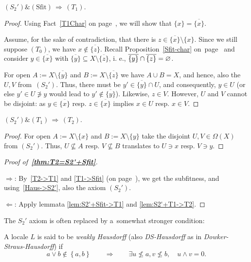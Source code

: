\begin{lem} \label{lem:S2'+Sfit->T1}
  $(S_2') \& (\text{Sfit}) \, \Rightarrow \, (T_1)$.
\end{lem}
\begin{proof}
  Using Fact~\ref{T1Char} on page~\pageref{T1Char}, we will show that $\{ x \}
  = \overline{\{ x \}}$.

  Assume, for the sake of contradiction, that there is $z\in \overline{\{ x \}}
  \setminus \{ x \}$.
  Since we still suppose $(T_0)$, we have $x\not\in \overline{\{ z \}}$.
  Recall Proposition~\ref{Sfit-char} on~page~\pageref{Sfit-char} and consider
  $y\in \overline{\{x\}}$ with $\overline{\{y\}} \subseteq X\setminus
  \overline{\{ z \}}$, i. e., $\overline{\{ y \}} \cap \overline{\{ z \}} =
  \varnothing$.

  For open $A := X \setminus \overline{\{ y \}}$ and $B := X \setminus
  \overline{\{ z \}}$ we have $A \cup B = X$, and hence, also the $U, V$
  from~$(S_2')$.
  Thus, there must be $y'\in \overline{\{ y \}} \cap U$, and consequently,
  $y\in U$ (or else $y'\in U\not\owns y$ would lead to $y'\not\in \overline{\{
  y \}}$).
  Likewise, $z\in V$.
  However, $U$ and $V$ cannot be disjoint:
  as $y\in \overline{\{ x \}}$ resp. $z\in \overline{\{ x \}}$ implies $x\in U$
  resp. $x\in V$.
\end{proof}

\begin{lem} \label{lem:S2'+T1->T2}
  $(S_2') \& (T_1) \, \Rightarrow \, (T_2)$.
\end{lem}
\begin{proof}
  For open $A := X\setminus \{ x \}$ and $B := X\setminus \{ y \}$ take the
  disjoint $U, V\in \Omega(X)$ from $(S_2')$.
  Thus, $U\not\subseteq A$ resp. $V\not\subseteq B$ translates to $U\owns x$
  resp. $V\owns y$.
\end{proof}

\begin{proof}[Proof of~{\bf\ref{thm:T2=S2'+Sfit}}]
  ~

  $\Rightarrow$:
  By~\ref{T2->T1} and \ref{T1->Sfit} (on page~\pageref{T1->Sfit}), we get the
  subfitness, and using~\ref{Haus->S2'}, also the axiom $(S_2')$.

  $\Leftarrow$:
  Apply lemmata \ref{lem:S2'+Sfit->T1} and \ref{lem:S2'+T1->T2}.
\end{proof}

The $S_2'$ axiom is often replaced by a~somewhat stronger condition:

\begin{framed}
  \begin{df}[DS-Haus]
    A locale $L$ is said to be \emph{weakly Hausdorff\/} (also
    \emph{DS-Hausdorff} as in \emph{Dowker-Straus-Hausdorff}) if
    \[
      a \vee b \not\in \left\{a, b\right\} \qquad \Rightarrow \qquad \exists
      u\not\leq a, v\not\leq b, \quad u \wedge v = 0.
    \]
  \end{df}
\end{framed}

